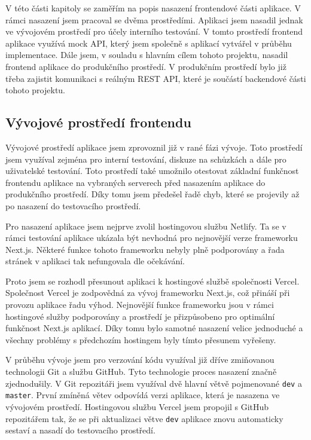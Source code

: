 V této části kapitoly se zaměřím na popis nasazení frontendové části aplikace. V rámci nasazení jsem pracoval se dvěma prostředími. Aplikaci jsem nasadil jednak ve vývojovém prostředí pro účely interního testování. V tomto prostředí frontend aplikace využívá mock API, který jsem společně s aplikací vytvářel v průběhu implementace. Dále jsem, v souladu s hlavním cílem tohoto projektu, nasadil frontend aplikace do produkčního prostředí. V produkčním prostředí bylo již třeba zajistit komunikaci s reálným REST API, které je součástí backendové části tohoto projektu.

\subsection{Vývojové prostředí frontendu}

Vývojové prostředí aplikace jsem zprovoznil již v rané fázi vývoje. Toto prostředí jsem využíval zejména pro interní testování, diskuze na schůzkách a dále pro uživatelské testování. Toto prostředí také umožnilo otestovat základní funkčnost frontendu aplikace na vybraných serverech před nasazením aplikace do produkčního prostředí. Díky tomu jsem předešel řadě chyb, které se projevily až po nasazení do testovacího prostředí.

Pro nasazení aplikace jsem nejprve zvolil hostingovou službu Netlify. Ta se v rámci testování aplikace ukázala být nevhodná pro nejnovější verze frameworku Next.js. Některé funkce tohoto frameworku nebyly plně podporovány a řada stránek v aplikaci tak nefungovala dle očekávání.

Proto jsem se rozhodl přesunout aplikaci k hostingové službě společnosti Vercel. Společnost Vercel je zodpovědná za vývoj frameworku Next.js, což přináší při provozu aplikace řadu výhod. Nejnovější funkce frameworku jsou v rámci hostingové služby podporovány a prostředí je přizpů\-sobeno pro optimální funkčnost Next.js aplikací. Díky tomu bylo samotné nasazení velice jednoduché a všechny problémy s předchozím hostingem byly tímto přesunem vyřešeny.

V průběhu vývoje jsem pro verzování kódu využíval již dříve zmiňovanou technologii Git a službu GitHub. Tyto technologie proces nasazení značně zjednodušily. V Git repozitáři jsem využíval dvě hlavní větvě pojmenované \texttt{dev} a \texttt{master}. První zmíněná větev odpovídá verzi aplikace, která je nasazena ve vývojovém prostředí. Hostingovou službu Vercel jsem propojil s GitHub repozitářem tak, že se při aktualizaci větve \texttt{dev} aplikace znovu automaticky sestaví a nasadí do testovacího prostředí.

